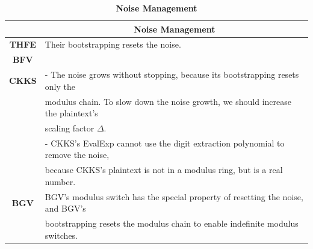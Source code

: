 \begin{table}[h]
\begin{tabular}{|c||l|}
\hline
&\multicolumn{1}{c|}{\textbf{Noise Management}}\\\hline\hline
\textbf{THFE}&Their bootstrapping resets the noise.\\
\textbf{BFV}&\\\hline
\textbf{CKKS}&- The noise grows without stopping, because its bootstrapping resets only the\\
& modulus chain. To slow down the noise growth, we should increase the plaintext's\\
&  scaling factor $\Delta$.\\
&- CKKS's \textsf{EvalExp} cannot use the digit extraction polynomial to remove the noise, \\
&because CKKS's plaintext is not in a modulus ring, but is a real number.\\\hline
\textbf{BGV}&BGV's modulus switch has the special property of resetting the noise, and BGV's\\
& bootstrapping resets the modulus chain to enable indefinite modulus switches.\\\hline
\end{tabular}
\caption{\textbf{Noise Management}}
\end{table}

